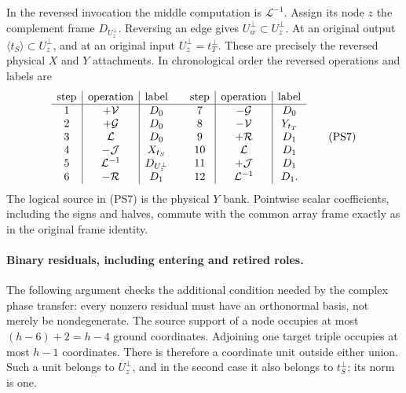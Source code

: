 In the reversed invocation the middle computation is $\mathcal L^{-1}$.
Assign its node $z$ the complement frame $D_{U_z^\perp}$.  Reversing
an edge gives $U_w^\perp\subset U_z^\perp$.  At an original output
$\langle t_S\rangle\subset U_z^\perp$, and at an original input
$U_z^\perp=t_T^\perp$.  These are precisely the reversed physical
$X$ and $Y$ attachments.  In chronological order the reversed operations
and labels are
\[
\begin{array}{c|c|c@{\qquad}c|c|c}
\text{step}&\text{operation}&\text{label}
 &\text{step}&\text{operation}&\text{label}\\ \hline
1&+\mathcal V&D_0&7&-\mathcal G&D_0\\
2&+\mathcal G&D_0&8&-\mathcal V&Y_{t_T}\\
3&\mathcal L&D_0&9&+\mathcal R&D_1\\
4&-\mathcal J&X_{t_S}&10&\mathcal L&D_1\\
5&\mathcal L^{-1}&D_{U_z^\perp}&11&+\mathcal J&D_1\\
6&-\mathcal R&D_1&12&\mathcal L^{-1}&D_1.
\end{array}                                                     \tag{PS7}
\]
The logical source in (PS7) is the physical $Y$ bank.  Pointwise scalar
coefficients, including the signs and halves, commute with the common
array frame exactly as in the original frame identity.

\paragraph{Binary residuals, including entering and retired roles.}
The following argument checks the additional condition needed by the
complex phase transfer: every nonzero residual must have an orthonormal
basis, not merely be nondegenerate.  The source support of a node occupies
at most $(h-6)+2=h-4$ ground coordinates.  Adjoining one target triple
occupies at most $h-1$ coordinates.  There is therefore a coordinate unit
outside either union.  Such a unit belongs to $U_z^\perp$, and in the
second case it also belongs to $t_S^\perp$; its norm is one.

